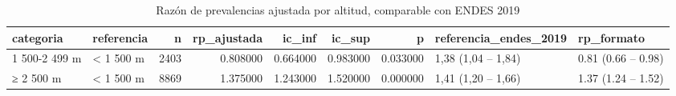 \begin{table}[htbp]
\caption{Razón de prevalencias ajustada por altitud, comparable con ENDES 2019}
\label{tab:tabla_40_altitud_rp_ajustada}
\begin{tabular}{llrrrrrll}
\toprule
categoria & referencia & n & rp\_ajustada & ic\_inf & ic\_sup & p & referencia\_endes\_2019 & rp\_formato \\
\midrule
1 500-2 499 m & < 1 500 m & 2403 & 0.808000 & 0.664000 & 0.983000 & 0.033000 & 1,38 (1,04 – 1,84) & 0.81 (0.66 – 0.98) \\
≥ 2 500 m & < 1 500 m & 8869 & 1.375000 & 1.243000 & 1.520000 & 0.000000 & 1,41 (1,20 – 1,66) & 1.37 (1.24 – 1.52) \\
\bottomrule
\end{tabular}
\end{table}
